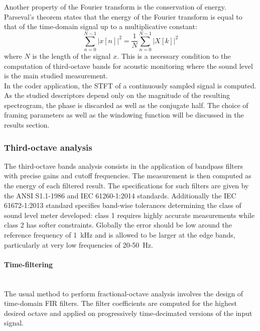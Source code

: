 \documentclass[12pt,times,onecolumn]{article}
\begin{document}
Another property of the Fourier transform is the conservation of energy. Parseval's theorem states that the energy of the Fourier transform is equal to that of the time-domain signal up to a multiplicative constant:
\begin{equation}
\sum\limits_{n=0}^{N-1}|x[n]|^2 = \frac{1}{N}\sum\limits_{n=0}^{N-1}|X[k]|^2
\end{equation}
where $N$ is the length of the signal $x$. This is a necessary condition to the computation of third-octave bands for acoustic monitoring where the sound level is the main studied measurement.\\

In the coder application, the STFT of a continuously sampled signal is computed. As the studied descriptors depend only on the magnitude of the resulting spectrogram, the phase is discarded as well as the conjugate half. The choice of framing parameters as well as the windowing function will be discussed in the results section.

\subsubsection{Third-octave analysis}
The third-octave bands analysis consists in the application of bandpass filters with precise gains and cutoff frequencies. The measurement is then computed as the energy of each filtered result. The specifications for such filters are given by the ANSI S1.1-1986 \cite{citeulike:9580295} and IEC 61260-1:2014 \cite{iec-norm} standards. Additionally the IEC 61672-1:2013 \cite{iec-norm2} standard specifies band-wise tolerances determining the class of sound level meter developed: class 1 requires highly accurate measurements while class 2 has softer constraints. Globally the error should be low around the reference frequency of 1~kHz and is allowed to be larger at the edge bands, particularly at very low frequencies of 20-50~Hz.

\paragraph{Time-filtering\\\\}
The usual method \cite{davis1986} to perform fractional-octave analysis involves the design of time-domain FIR filters. The filter coefficients are computed for the highest desired octave and applied on progressively time-decimated versions of the input signal.\\
\end{document}
